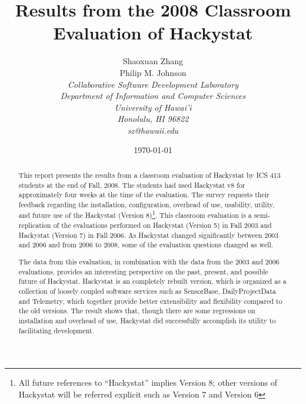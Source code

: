 \documentclass[11pt]{article}
\begin{document}
\title{Results from the 2008 Classroom Evaluation of Hackystat}

\author{Shaoxuan Zhang \\
				 Philip M. Johnson \\
\em  Collaborative Software Development Laboratory \\
\em  Department of Information and Computer Sciences \\
\em  University of Hawai'i \\
\em  Honolulu, HI 96822 \\
\em  sz@hawaii.edu \\
}

\date{\today}
\maketitle

\tableofcontents

\graphicspath{{figures/}} 

\newpage
\begin{abstract}
This report presents the results from a classroom evaluation of Hackystat by ICS 413 students at the end of Fall, 2008.  The students had used Hackystat v8 for approximately four weeks at the time of the evaluation.  The survey requests their feedback regarding the installation, configuration, overhead of use, usability, utility, and future use of the Hackystat (Version 8)\footnote{All future references to ``Hackystat'' implies Version 8; other versions of Hackystat will be referred explicit such as Version 7 and Version 6}. This classroom evaluation is a semi-replication of the evaluations performed on Hackystat (Version 5) in Fall 2003\cite{csdl2-03-13} and Hackystat (Version 7) in Fall 2006\cite{csdl2-07-02}. As Hackystat changed significantly between 2003 and 2006 and from 2006 to 2008, some of the evaluation questions changed as well.

The data from this evaluation, in combination with the data from the 2003 and 2006 evaluations, provides an interesting perspective on the past, present, and possible future of Hackystat. Hackystat is an completely rebuilt version, which is organized as a collection of loosely coupled software services such as SensorBase, DailyProjectData and Telemetry, which together provide better extensibility and flexibility compared to the old versions. The result shows that, though there are some regressions on installation and overhead of use, Hackystat did successfully accomplish its utility to facilitating development. 
\end{abstract}
\end{document}
